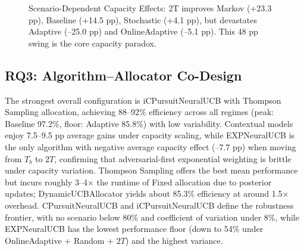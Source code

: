 \documentclass[10pt,twocolumn,journal]{IEEEtran}
\begin{document}
\begin{figure}[t]
\centering
{}
\caption{Scenario-Dependent Capacity Effects: 2T improves Markov (+23.3 pp), Baseline (+14.5 pp), Stochastic (+4.1 pp), but devastates Adaptive (--25.0 pp) and OnlineAdaptive (--5.1 pp). This 48 pp swing is the core capacity paradox.}
\label{fig:scenario_capacity}
\end{figure}

\subsection{RQ3: Algorithm--Allocator Co-Design}

The strongest overall configuration is iCPursuitNeuralUCB with Thompson Sampling allocation, achieving 88--92\% efficiency across all regimes (peak: Baseline 97.2\%, floor: Adaptive 85.8\%) with low variability. Contextual models enjoy 7.5--9.5 pp average gains under capacity scaling, while EXPNeuralUCB is the only algorithm with negative average capacity effect (--7.7 pp) when moving from $T_b$ to $2T$, confirming that adversarial-first exponential weighting is brittle under capacity variation. Thompson Sampling offers the best mean performance but incurs roughly 3--4$\times$ the runtime of Fixed allocation due to posterior updates; DynamicUCBAllocator yields about 85.3\% efficiency at around 1.5$\times$ overhead. CPursuitNeuralUCB and iCPursuitNeuralUCB define the robustness frontier, with no scenario below 80\% and coefficient of variation under 8\%, while EXPNeuralUCB has the lowest performance floor (down to 54\% under OnlineAdaptive + Random + $2T$) and the highest variance.
\end{document}
